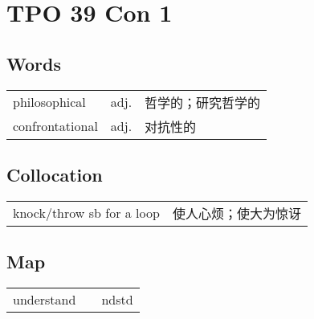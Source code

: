 \section{TPO 39 Con 1}

\subsection{Words}

\begin{tabular}{lll}
    philosophical   & adj. & 哲学的；研究哲学的 \\
    confrontational & adj. & 对抗性的      \\
\end{tabular}

\subsection{Collocation}

\begin{tabular}{ll}
    knock/throw sb for a loop & 使人心烦；使大为惊讶 \\
\end{tabular}

\subsection{Map}

\begin{tabular}{rc@{\quad$\to$\quad}l}
    understand &  & ndstd \\
\end{tabular}
